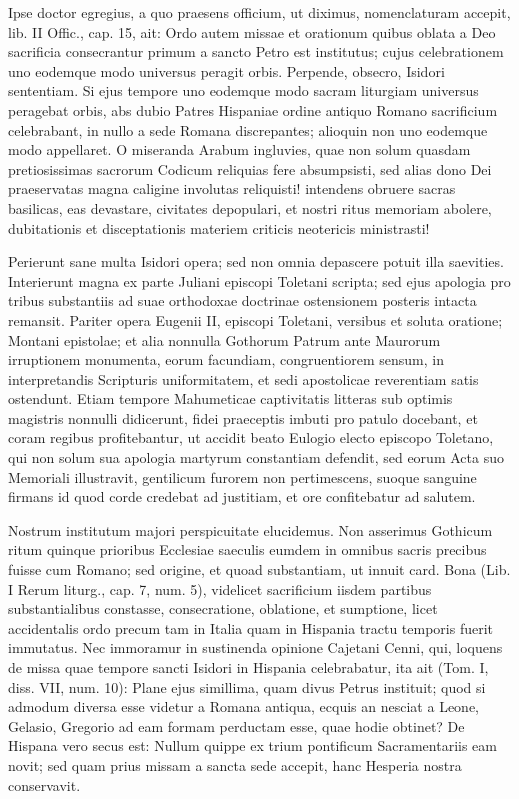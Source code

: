 \documentclass[letter,11pt]{book}
\begin{document}
Ipse doctor egregius, a quo praesens officium, ut diximus, nomenclaturam accepit, lib. II Offic., cap. 15, ait: Ordo autem missae et orationum quibus oblata a Deo sacrificia consecrantur primum a sancto Petro est institutus; cujus celebrationem uno eodemque modo universus peragit orbis. Perpende, obsecro, Isidori sententiam. Si ejus tempore uno eodemque modo sacram liturgiam universus peragebat orbis, abs dubio Patres Hispaniae ordine antiquo Romano sacrificium celebrabant, in nullo a sede Romana discrepantes; alioquin non uno eodemque modo appellaret. O miseranda Arabum ingluvies, quae non solum quasdam pretiosissimas sacrorum Codicum reliquias fere absumpsisti, sed alias dono Dei praeservatas magna caligine involutas reliquisti! intendens obruere sacras basilicas, eas devastare, civitates depopulari, et nostri ritus memoriam abolere, dubitationis et disceptationis materiem criticis neotericis ministrasti!

Perierunt sane multa Isidori opera; sed non omnia depascere potuit illa saevities. Interierunt magna ex parte Juliani episcopi Toletani scripta; sed ejus apologia pro tribus substantiis ad suae orthodoxae doctrinae ostensionem posteris intacta remansit. Pariter opera Eugenii II, episcopi Toletani, versibus et soluta oratione; Montani epistolae; et alia nonnulla Gothorum Patrum ante Maurorum irruptionem monumenta, eorum facundiam, congruentiorem sensum, in interpretandis Scripturis uniformitatem, et sedi apostolicae reverentiam satis ostendunt. Etiam tempore Mahumeticae captivitatis litteras sub optimis magistris nonnulli didicerunt, fidei praeceptis imbuti pro patulo docebant, et coram regibus profitebantur, ut accidit beato Eulogio electo episcopo Toletano, qui non solum sua apologia martyrum constantiam defendit, sed eorum Acta suo Memoriali illustravit, gentilicum furorem non pertimescens, suoque sanguine firmans id quod corde credebat ad justitiam, et ore confitebatur ad salutem.

Nostrum institutum majori perspicuitate elucidemus. Non asserimus Gothicum ritum quinque prioribus Ecclesiae saeculis eumdem in omnibus sacris precibus fuisse cum Romano; sed origine, et quoad substantiam, ut innuit card. Bona (Lib. I Rerum liturg., cap. 7, num. 5), videlicet sacrificium iisdem partibus substantialibus constasse, consecratione, oblatione, et sumptione, licet accidentalis ordo precum tam in Italia quam in Hispania tractu temporis fuerit immutatus. Nec immoramur in sustinenda opinione Cajetani Cenni, qui, loquens de missa quae tempore sancti Isidori in Hispania celebrabatur, ita ait (Tom. I, diss. VII, num. 10): Plane ejus simillima, quam divus Petrus instituit; quod si admodum diversa esse videtur a Romana antiqua, ecquis an nesciat a Leone, Gelasio, Gregorio ad eam formam perductam esse, quae hodie obtinet? De Hispana vero secus est: Nullum quippe ex trium pontificum Sacramentariis eam novit; sed quam prius missam a sancta sede accepit, hanc Hesperia nostra conservavit.
\end{document}
